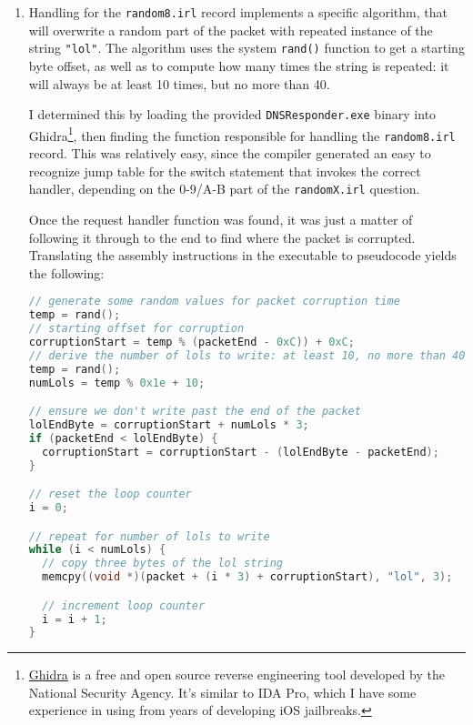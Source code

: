 \documentclass[11pt]{article}
\begin{document}
\begin{enumerate}
\item {
Handling for the \texttt{random8.irl} record implements a specific algorithm, that will overwrite a random part of the packet with repeated instance of the string \texttt{"lol"}. The algorithm uses the system \texttt{rand()} function to get a starting byte offset, as well as to compute how many times the string is repeated: it will always be at least 10 times, but no more than 40.

I determined this by loading the provided \texttt{DNSResponder.exe} binary into Ghidra\footnote{\href{https://ghidra-sre.org}{Ghidra} is a free and open source reverse engineering tool developed by the National Security Agency. It's similar to IDA Pro, which I have some experience in using from years of developing iOS jailbreaks.}, then finding the function responsible for handling the \texttt{random8.irl} record. This was relatively easy, since the compiler generated an easy to recognize jump table for the switch statement that invokes the correct handler, depending on the 0-9/A-B part of the \texttt{randomX.irl} question.

Once the request handler function was found, it was just a matter of following it through to the end to find where the packet is corrupted. Translating the assembly instructions in the executable to pseudocode yields the following:

\begin{lstlisting}[language=c++,label=random8-lol-corruption,caption=Pseudocode of corruption function,keywordstyle=\bfseries\color{green!40!black},commentstyle=\itshape\color{purple!40!black},identifierstyle=\color{blue},stringstyle=\color{orange},]
// generate some random values for packet corruption time
temp = rand();
// starting offset for corruption
corruptionStart = temp % (packetEnd - 0xC)) + 0xC;
// derive the number of lols to write: at least 10, no more than 40
temp = rand();
numLols = temp % 0x1e + 10;

// ensure we don't write past the end of the packet
lolEndByte = corruptionStart + numLols * 3;
if (packetEnd < lolEndByte) {
  corruptionStart = corruptionStart - (lolEndByte - packetEnd);
}

// reset the loop counter
i = 0;

// repeat for number of lols to write
while (i < numLols) {
  // copy three bytes of the lol string
  memcpy((void *)(packet + (i * 3) + corruptionStart), "lol", 3);

  // increment loop counter
  i = i + 1;
}
\end{lstlisting}
}

\end{enumerate}
\end{document}
